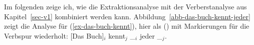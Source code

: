Im folgenden zeige ich, wie die Extraktionsanalyse
mit der Verberstanalyse aus Kapitel~\ref{sec-v1} kombiniert werden kann.
Abbildung~\vref{abb-das-buch-kennt-jeder} zeigt die Analyse für (\ref{ex-das-buch-kennt}),
hier als () mit Markierungen für die Verbspur wiederholt:
\ea
{}[Das Buch]$_i$ kennt$_j$  \_$_i$ jeder \_$_j$.
\z
\begin{figure}[htb]

\end{figure}
